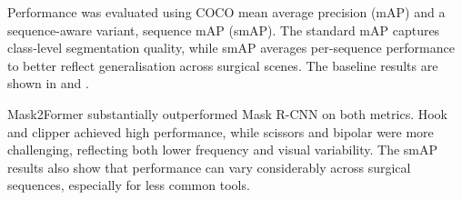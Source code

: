 Performance was evaluated using COCO mean average precision (mAP) and a sequence-aware variant, sequence mAP (smAP). The standard mAP captures class-level segmentation quality, while smAP averages per-sequence performance to better reflect generalisation across surgical scenes. The baseline results are shown in  and .

\begin{table}[ht]
\centering
{}
\caption{Baseline instance segmentation performance on CholecInstanceSeg using mAP. GR: grasper; HO: hook; IR: irrigator; CL: clipper; BI: bipolar; SC: scissors; SN: snare.}
\label{tab:cholecinstanceseg-map}
\end{table}

\begin{table}[ht]
\centering
{}
\caption{Baseline instance segmentation performance using sequence mAP. The standard deviation indicates variability across sequences.}
\label{tab:cholecinstanceseg-smap}
\end{table}

Mask2Former substantially outperformed Mask R-CNN on both metrics. Hook and clipper achieved high performance, while scissors and bipolar were more challenging, reflecting both lower frequency and visual variability. The smAP results also show that performance can vary considerably across surgical sequences, especially for less common tools.

